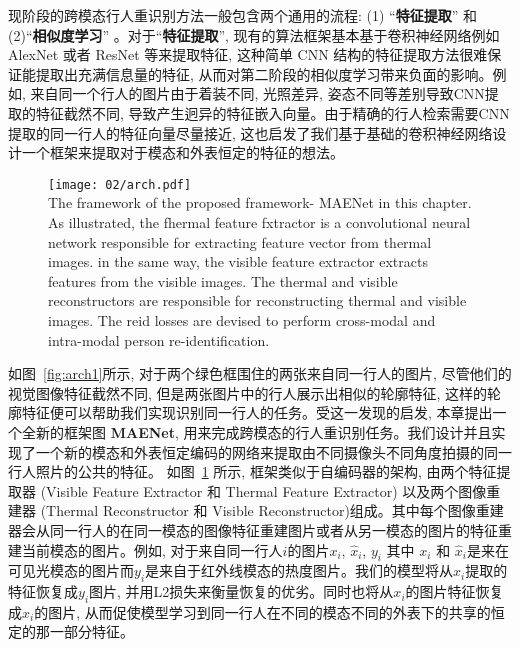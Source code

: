 现阶段的跨模态行人重识别方法一般包含两个通用的流程: (1) ``\textbf{特征提取}'' 和 (2)``\textbf{相似度学习}'' 。对于``\textbf{特征提取}'', 现有的算法框架基本基于卷积神经网络例如 AlexNet 或者 ResNet 等来提取特征, 这种简单 CNN 结构的特征提取方法很难保证能提取出充满信息量的特征, 从而对第二阶段的相似度学习带来负面的影响。例如, 来自同一个行人的图片由于着装不同, 光照差异, 姿态不同等差别导致CNN提取的特征截然不同, 导致产生迥异的特征嵌入向量。由于精确的行人检索需要CNN提取的同一行人的特征向量尽量接近, 这也启发了我们基于基础的卷积神经网络设计一个框架来提取对于模态和外表恒定的特征的想法。
\begin{figure}[!htp]
    \centering
    \texttt{[image: 02/arch.pdf]} \\
      {The framework of the proposed framework- MAENet in this chapter. As illustrated, the fhermal feature fxtractor is a convolutional neural network responsible for extracting feature vector from thermal images. in the same way, the visible feature extractor extracts features from the visible images. The thermal and visible reconstructors are responsible for reconstructing thermal and visible images. The reid losses are devised to perform cross-modal and intra-modal person re-identification.}   
      \label{fig:arch}
\end{figure} 
如图~\ref{fig:arch1}所示, 对于两个绿色框围住的两张来自同一行人的图片, 尽管他们的视觉图像特征截然不同, 但是两张图片中的行人展示出相似的轮廓特征, 这样的轮廓特征便可以帮助我们实现识别同一行人的任务。受这一发现的启发, 本章提出一个全新的框架图 \textbf{MAENet}, 用来完成跨模态的行人重识别任务。我们设计并且实现了一个新的模态和外表恒定编码的网络来提取由不同摄像头不同角度拍摄的同一行人照片的公共的特征。 如图~\ref{fig:arch} 所示, 框架类似于自编码器的架构, 由两个特征提取器 (Visible Feature Extractor 和 Thermal Feature Extractor) 以及两个图像重建器 (Thermal Reconstructor 和 Visible Reconstructor)组成。其中每个图像重建器会从同一行人的在同一模态的图像特征重建图片或者从另一模态的图片的特征重建当前模态的图片。例如, 对于来自同一行人$i$的图片$x_i$, $\hat{x}_i$, $y_i$ 其中 $x_i$ 和 $\hat{x}_i$是来在可见光模态的图片而$y_i$是来自于红外线模态的热度图片。我们的模型将从$x_i$提取的特征恢复成$y_i$图片, 并用L2损失来衡量恢复的优劣。同时也将从$x_i$的图片特征恢复成$\hat{x}_i$的图片, 从而促使模型学习到同一行人在不同的模态不同的外表下的共享的恒定的那一部分特征。
